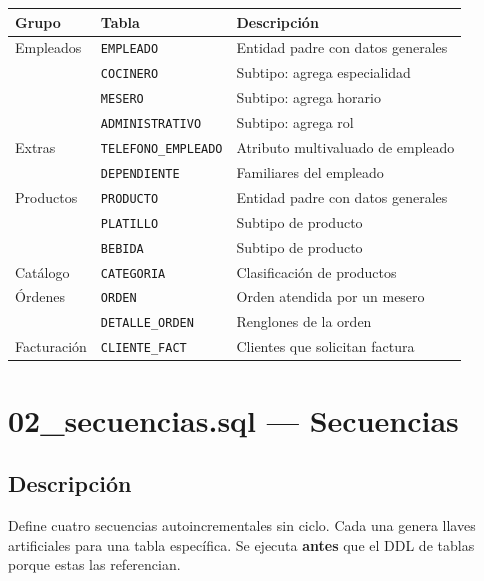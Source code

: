 \documentclass[12pt, a4paper]{article}
\begin{document}
\begin{center}
\begin{tabularx}{\textwidth}{llX}
    \toprule
    \textbf{Grupo} & \textbf{Tabla} & \textbf{Descripci\'on} \\
    \midrule
    Empleados     & \texttt{EMPLEADO}          & Entidad padre con datos generales \\
                  & \texttt{COCINERO}          & Subtipo: agrega especialidad \\
                  & \texttt{MESERO}            & Subtipo: agrega horario \\
                  & \texttt{ADMINISTRATIVO}    & Subtipo: agrega rol \\
    \midrule
    Extras        & \texttt{TELEFONO\_EMPLEADO} & Atributo multivaluado de empleado \\
                  & \texttt{DEPENDIENTE}        & Familiares del empleado \\
    \midrule
    Productos     & \texttt{PRODUCTO}           & Entidad padre con datos generales \\
                  & \texttt{PLATILLO}           & Subtipo de producto \\
                  & \texttt{BEBIDA}             & Subtipo de producto \\
    \midrule
    Cat\'alogo    & \texttt{CATEGORIA}          & Clasificaci\'on de productos \\
    \midrule
    \'Ordenes     & \texttt{ORDEN}              & Orden atendida por un mesero \\
                  & \texttt{DETALLE\_ORDEN}     & Renglones de la orden \\
    \midrule
    Facturaci\'on & \texttt{CLIENTE\_FACT}      & Clientes que solicitan factura \\
    \bottomrule
\end{tabularx}
\end{center}

\section{02\_secuencias.sql --- Secuencias}

\subsection{Descripci\'on}

Define cuatro secuencias autoincrementales sin ciclo. Cada una genera llaves artificiales para una tabla espec\'ifica. Se ejecuta \textbf{antes} que el DDL de tablas porque estas las referencian.
\end{document}
